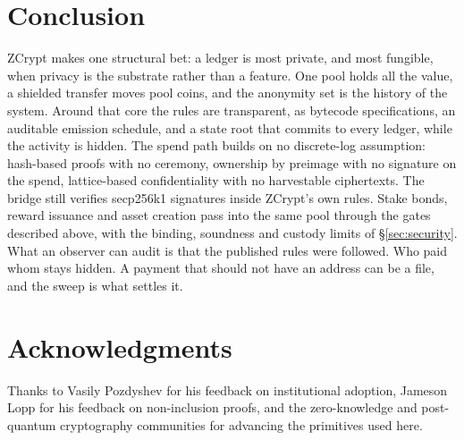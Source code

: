 \documentclass[twocolumn,10pt]{article}
\begin{document}
\section{Conclusion}

ZCrypt makes one structural bet: a ledger is most private, and most fungible, when privacy is the substrate rather than a feature. One pool holds all the value, a shielded transfer moves pool coins, and the anonymity set is the history of the system. Around that core the rules are transparent, as bytecode specifications, an auditable emission schedule, and a state root that commits to every ledger, while the activity is hidden. The spend path builds on no discrete-log assumption: hash-based proofs with no ceremony, ownership by preimage with no signature on the spend, lattice-based confidentiality with no harvestable ciphertexts. The bridge still verifies secp256k1 signatures inside ZCrypt's own rules. Stake bonds, reward issuance and asset creation pass into the same pool through the gates described above, with the binding, soundness and custody limits of \S\ref{sec:security}. What an observer can audit is that the published rules were followed. Who paid whom stays hidden. A payment that should not have an address can be a file, and the sweep is what settles it.

\section*{Acknowledgments}

Thanks to Vasily Pozdyshev for his feedback on institutional adoption, Jameson Lopp for his feedback on non-inclusion proofs, and the zero-knowledge and post-quantum cryptography communities for advancing the primitives used here.
\end{document}
